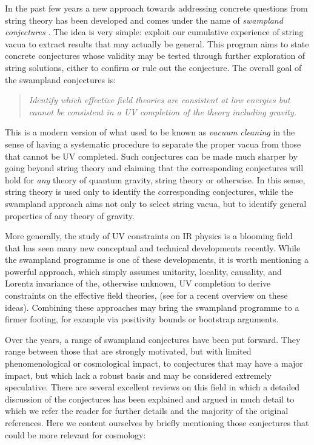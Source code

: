 In the past few years a new approach towards addressing concrete questions from string theory has been developed and comes under the name of {\it swampland conjectures} \cite{Vafa:2005ui}. The idea is very simple: exploit our cumulative experience of string vacua to extract results that may actually be general. This program aims to state concrete conjectures whose validity may be tested through further exploration of string solutions, either to confirm or rule out the conjecture. The overall goal of the swampland conjectures is:

\begin{quotation}
\emph{Identify which effective field theories are consistent at low energies but cannot be consistent in a UV completion of the theory including gravity.}
\end{quotation}

This is a modern version of what used to be known as {\it vacuum cleaning} in the sense of having a systematic procedure to separate the proper vacua from those that cannot be UV completed. Such conjectures can be made much sharper by going beyond string theory and claiming that the corresponding conjectures will hold for {\it any} theory of quantum gravity, string theory or otherwise. In this sense, string theory is used only to identify the corresponding conjectures, while the swampland approach aims not only to select string vacua, but to identify general properties of any theory of gravity.


More generally, the study of UV constraints on IR physics is a  blooming field that has seen many new conceptual and technical developments recently.
While the swampland programme is one of these developments,  it is worth mentioning a powerful approach, which simply assumes  unitarity, locality, causality, and Lorentz invariance of the, otherwise unknown, UV completion to derive  constraints on the effective field theories, (see \cite{deRham:2022hpx} for a recent overview on these ideas). Combining these approaches may bring the swampland programme to a firmer footing, for example via positivity bounds or bootstrap arguments. 

Over the years, a range of swampland conjectures have been put forward. They range between those that are strongly motivated, but with limited phenomenological or cosmological impact, to conjectures that may have a major impact, but which lack a robust basis and may be considered extremely speculative. There are several excellent reviews on this field in which a detailed discussion of the conjectures has been explained and argued in much detail \cite{Brennan:2017rbf,Palti:2019pca,vanBeest:2021lhn, Grana:2021zvf} to which we refer the reader for further details and the majority of the original references. Here we content ourselves by briefly mentioning those conjectures that could be more relevant for cosmology:


